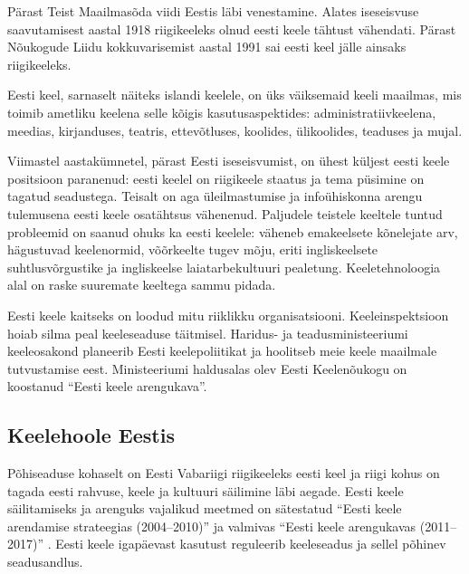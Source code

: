 \documentclass[]{../metanetpaper}
\begin{document}
\begin{multicols}{2}
Pärast Teist Maailmasõda viidi Eestis läbi venestamine. 
Alates iseseisvuse saavutamisest aastal 1918 riigikeeleks olnud eesti keele tähtust vähendati. 
Pärast Nõukogude Liidu kokkuvarisemist aastal 1991 sai eesti keel jälle ainsaks riigikeeleks.



Eesti keel, sarnaselt näiteks islandi keelele, on üks väiksemaid keeli maailmas, mis toimib ametliku keelena selle kõigis kasutusaspektides: administratiivkeelena, meedias, kirjanduses, teatris, ettevõtluses, koolides, ülikoolides, teaduses ja mujal.

Viimastel aastakümnetel, pärast Eesti ise\-seisvumist, on ühest küljest eesti keele positsioon paranenud: eesti keelel on riigi\-keele staatus ja tema püsimine on tagatud seadustega. 
Teisalt on aga üleilmastumise ja infoühiskonna arengu tulemusena eesti keele osatähtsus vähenenud. 
Paljudele teistele keeltele tuntud probleemid on saanud ohuks ka eesti keelele: väheneb emakeelsete kõnelejate arv, hägustuvad keelenormid, võõrkeelte tugev mõju, eriti ingliskeelsete suhtlusvõrgustike ja ingliskeelse laiatarbekultuuri pealetung. 
Keeletehnoloogia alal on raske suuremate keeltega sam\-mu pidada.

 
Eesti keele kaitseks on loodud mitu riiklikku organisatsiooni.
Keeleinspektsioon hoiab silma peal keeleseaduse täitmisel. 
Haridus- ja teadus\-ministeeriumi keeleosakond planee\-rib Eesti keelepoliitikat ja hoolitseb meie keele maailmale tutvustamise eest. 
Ministeeriumi haldusalas olev Eesti Keelenõu\-kogu on koostanud ``Eesti keele arengukava''.

\subsection{Keelehoole Eestis}

Põhiseaduse kohaselt on Eesti Vabariigi riigi\-keeleks eesti keel ja riigi kohus on tagada eesti rahvuse, keele ja kultuuri säili\-mine läbi aegade. 
Eesti keele säilitamiseks ja arenguks vajalikud meetmed on sätestatud
``Eesti keele arendamise strateegias (2004--2010)''
\cite{KeeleStratEst} ja valmivas ``Eesti keele arengukavas
(2011--2017)'' \cite{DevPlan}.  
Eesti keele igapäevast kasutust reguleerib keeleseadus ja sellel põhinev seadusandlus.


\end{multicols}
\end{document}
